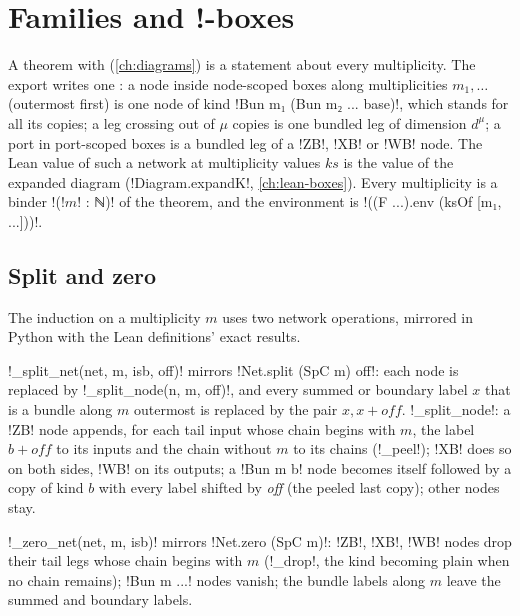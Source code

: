 {\section{Families and !-boxes}\label{sec:lean-export-net-families}

A theorem with \bboxes{} (\cref{ch:diagrams}) is a statement about every multiplicity. The
export writes one : a node inside node-scoped boxes along multiplicities
$m_1, \dots$ (outermost first) is one node of kind \code!Bun m₁ (Bun m₂ ... base)!, which stands
for all its copies; a leg crossing out of $\mu$ copies is one bundled leg of dimension
$d^{\mu}$; a port in port-scoped boxes is a bundled leg of a \code!ZB!, \code!XB! or \code!WB!
node. The Lean value of such a network at multiplicity values $\mathit{ks}$ is the value of the
expanded diagram (\lean!Diagram.expandK!, \cref{ch:lean-boxes}). Every multiplicity is a binder
\code!(!$m$\code! : ℕ)! of the theorem, and the environment is
\code!((F ...).env (ksOf [m₁, ...]))!.

\subsection{Split and zero}\label{sec:lean-export-net-split}

The induction on a multiplicity $m$ uses two network operations, mirrored in Python with the
Lean definitions' exact results.

\begin{definition}[Split]\label{def:lean-export-net-split}
\py!_split_net(net, m, isb, off)! mirrors \lean!Net.split (SpC m) off!: each node is replaced by
\py!_split_node(n, m, off)!, and every summed or boundary label $x$ that is a bundle along $m$
outermost is replaced by the pair $x, x+\textit{off}$. \py!_split_node!: a \code!ZB! node appends,
for each tail input whose chain begins with $m$, the label $b+\textit{off}$ to its inputs and the
chain without $m$ to its chains (\py!_peel!); \code!XB! does so on both sides, \code!WB! on its
outputs; a \code!Bun m b! node becomes itself followed by a copy of kind $b$ with every label
shifted by \textit{off} (the peeled last copy); other nodes stay.
\end{definition}

\begin{definition}[Zero]\label{def:lean-export-net-zero}
\py!_zero_net(net, m, isb)! mirrors \lean!Net.zero (SpC m)!: \code!ZB!, \code!XB!, \code!WB!
nodes drop their tail legs whose chain begins with $m$ (\py!_drop!, the kind becoming plain when
no chain remains); \code!Bun m ...! nodes vanish; the bundle labels along $m$ leave the summed and
boundary labels.
\end{definition}

}
